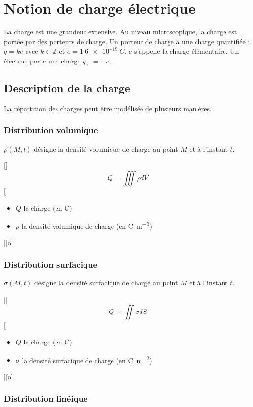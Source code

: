 \section{Notion de charge électrique}

La charge est une grandeur extensive. Au niveau microscopique, la charge est portée par des porteurs de charge. Un porteur de charge a une charge quantifiée : $q=ke$ avec $k\in\mathbb{Z}$ et $e=\SI{1.6e-19}{C}$. $e$ s'appelle la charge élémentaire. Un électron porte une charge $q_{e^-}=-e$.

\subsection{Description de la charge}

La répartition des charges peut être modélisée de plusieurs manières.

\subsubsection{Distribution volumique}

$\rho(M,t)$ désigne la densité volumique de charge au point $M$ et à l'instant $t$.

[]
{$$Q=\iiint\rho dV$$}
[
    \begin{itemize}
        \item $Q$ la charge (en \unit{C})
        \item $\rho$ la densité volumique de charge (en \unit{C.m^{-3}})
    \end{itemize}
][o]

\subsubsection{Distribution surfacique}

$\sigma(M,t)$ désigne la densité surfacique de charge au point $M$ et à l'instant $t$.

[]
{$$Q=\iint\sigma dS$$}
[
    \begin{itemize}
        \item $Q$ la charge (en \unit{C})
        \item $\sigma$ la densité surfacique de charge (en \unit{C.m^{-2}})
    \end{itemize}
][o]

\subsubsection{Distribution linéique}

